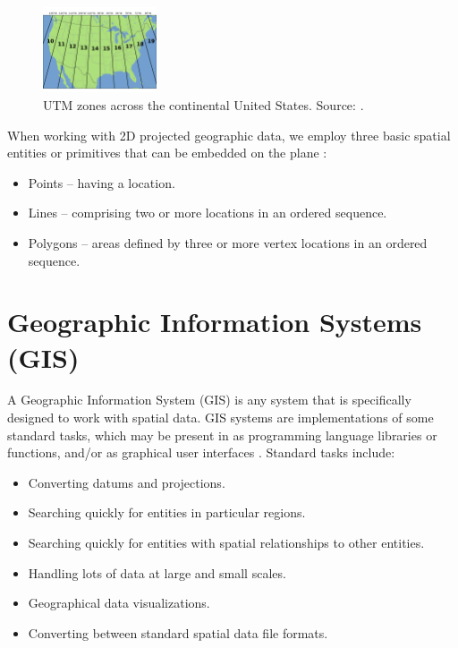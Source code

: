 {{\begin{figure}[h!]
	\centering
	\includegraphics[width=0.3\textwidth]{Figures/UTM-zones.png}
	\caption{UTM zones across the continental United States. Source: \cite{chrismurf_2009}.
		\label{fig:utm-zones}}
\end{figure}

When working with 2D projected geographic data, we employ three basic spatial entities or primitives that can be embedded on the plane \cite{iso_simple_features}:

\begin{itemize}
	\item Points -- having a location.
	\item Lines -- comprising two or more locations in an ordered sequence.
	\item Polygons -- areas defined by three or more vertex locations in an ordered sequence.
\end{itemize}

\section{Geographic Information Systems (GIS)}

A Geographic Information System (GIS) is any system that is specifically designed to work with spatial data. GIS systems are implementations of some standard tasks, which may be present in as programming language libraries or functions, and/or as graphical user interfaces \cite{fox_spatial_2018}. Standard tasks include:

\begin{itemize}
	\item Converting datums and projections.
	\item Searching quickly for entities in particular regions.
	\item Searching quickly for entities with spatial relationships to other entities.
	\item Handling lots of data at large and small scales.
	\item Geographical data visualizations.
	\item Converting between standard spatial data file formats.
\end{itemize}

}}
